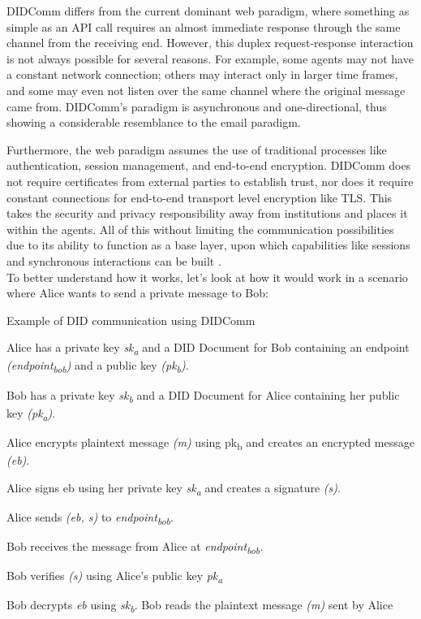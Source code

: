 DIDComm differs from the current dominant web paradigm, where something as simple as an API call requires an almost immediate response through the same channel from the receiving end. However, this duplex request-response interaction is not always possible for several reasons. For example, some agents may not have a constant network connection; others may interact only in larger time frames, and some may even not listen over the same channel where the original message came from. DIDComm's paradigm is asynchronous and one-directional, thus showing a considerable resemblance to the email paradigm. \

Furthermore, the web paradigm assumes the use of traditional processes like authentication, session management, and end-to-end encryption. DIDComm does not require certificates from external parties to establish trust, nor does it require constant connections for end-to-end transport level encryption like TLS. This takes the security and privacy responsibility away from institutions and places it within the agents. All of this without limiting the communication possibilities due to its ability to function as a base layer, upon which capabilities like sessions and synchronous interactions can be built \cite{curren_looker_terbu_2020}.\\ 
To better understand how it works, let's look at how it would work in a scenario where Alice wants to send a private message to Bob: 

\begin{algorithm}[H]
\caption{Example of DID communication using DIDComm \cite{Abramson_2020}}
\label{alg:didcomm_example}
  \begin{algorithmic}[1]
    \State Alice has a private key \emph{sk\textsubscript{a}} and a DID Document for Bob containing an endpoint \emph{(endpoint\textsubscript{bob})} and a public key \emph{(pk\textsubscript{b})}.

    \State Bob has a private key \emph{sk\textsubscript{b}} and a DID Document for Alice containing her public key \emph{(pk\textsubscript{a})}.

    \State Alice encrypts plaintext message \emph{(m)} using pk\textsubscript{b} and creates an encrypted message \emph{(eb)}.

    \State Alice signs eb using her private key \emph{sk\textsubscript{a}} and creates a signature \emph{(s)}.

    \State Alice sends \emph{(eb, s)} to \emph{endpoint\textsubscript{bob}}.

    \State Bob receives the message from Alice at \emph{{endpoint\textsubscript{bob}}.}

    \State Bob verifies \emph{(s)} using Alice's public key \emph{pk\textsubscript{a}}

    \State Bob decrypts \emph{eb} using \emph{sk\textsubscript{b}}.
    \State Bob reads the plaintext message \emph{(m)} sent by Alice
    \EndIf
  \end{algorithmic}
\end{algorithm}

